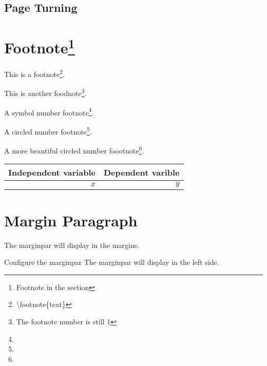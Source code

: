 \documentclass{article}
\begin{document}
        \subsection{Page Turning} 
            \pagebreak[4]
            \enlargethispage{8em}

    \section{Footnote\protect\footnote{Footnote in the section}}
        This is a footnote\footnote{\textbackslash footnote\{text\}}. \par
        This is another foodnote\footnote[1]{The footnote number is still 1}. 
        
        \renewcommand\thefootnote{\fnsymbol{footnote}}
        A symbol number footnote\footnote{}. \par
        \renewcommand\thefootnote{\textcircled{\arabic{footnote}}}
        A circled number footnote\footnote{}. 
       
        \renewcommand\thefootnote{\ding{\numexpr171+\value{footnote}}}
        A more beautiful circled number foootnote\footnote{}. 
    
        \begin{tabular}{r|r}
            Independent variable & Dependent varible\footnotemark \\
            \hline
            $x$ & $y$
        \end{tabular}

    \section{Margin Paragraph}
        The marginpar will display in the margins. \par
        Configure the marginpar
        {
            \reversemarginpar
            The marginpar will display in the left side. 
        }


        
\end{document}
